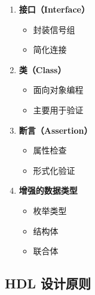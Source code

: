 \begin{enumerate}
  \item \textbf{接口（Interface）}
    \begin{itemize}
      \item 封装信号组
      \item 简化连接
    \end{itemize}

  \item \textbf{类（Class）}
    \begin{itemize}
      \item 面向对象编程
      \item 主要用于验证
    \end{itemize}

  \item \textbf{断言（Assertion）}
    \begin{itemize}
      \item 属性检查
      \item 形式化验证
    \end{itemize}

  \item \textbf{增强的数据类型}
    \begin{itemize}
      \item 枚举类型
      \item 结构体
      \item 联合体
    \end{itemize}
\end{enumerate}

\subsection{HDL 设计原则}

